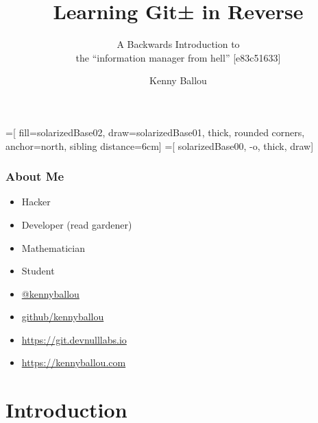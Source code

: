 \documentclass{beamer}
\title{Learning Git± in Reverse}
\subtitle{A Backwards Introduction to \\{} the ``information manager from
hell'' [e83c51633]}
\author[Ballou]{Kenny Ballou}
\institute[/dev/null]{/dev/null > labs}
\begin{document}
=[%
    fill=solarizedBase02,
    draw=solarizedBase01,
    thick,
    rounded corners,
    anchor=north,
    sibling distance=6cm]
=[%
    solarizedBase00,
    -o,
    thick,
    draw]


\begin{frame}[label=titleslide]
\titlepage{}
\end{frame}

\begin{frame}
\tableofcontents[subsectionstyle=hide]
\end{frame}

\begin{frame}
\frametitle{About Me}
\begin{itemize}
\item{Hacker}
\item{Developer (read gardener)}
\item{Mathematician}
\item{Student}
\item{\href{https://twitter.com/kennyballou}{@kennyballou}}
\item{\href{https://github.com}{github/kennyballou}}
\item{\url{https://git.devnulllabs.io}}
\item{\url{https://kennyballou.com}}
\end{itemize}

\end{frame}

\section{Introduction}
\end{document}
